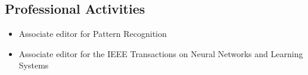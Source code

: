 \documentclass[a4paper,10pt]{article}
\begin{document}


% 

\subsection*{Professional Activities}
\begin{itemize}
\item Associate editor for Pattern Recognition
\item Associate editor for the IEEE Transactions on Neural Networks and Learning Systems
\end{itemize}
\end{document}
